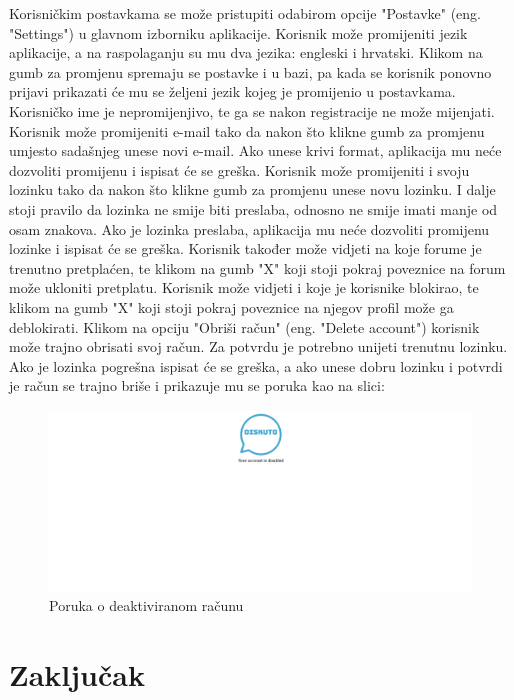 \documentclass{foi}
\begin{document}
Korisničkim postavkama se može pristupiti odabirom opcije "Postavke" (eng. "Settings") u glavnom izborniku aplikacije. Korisnik može promijeniti jezik aplikacije, a na raspolaganju su mu dva jezika: engleski i hrvatski. Klikom na gumb za promjenu spremaju se postavke i u bazi, pa kada se korisnik ponovno prijavi prikazati će mu se željeni jezik kojeg je promijenio u postavkama. Korisničko ime je nepromijenjivo, te ga se nakon registracije ne može mijenjati. Korisnik može promijeniti e-mail tako da nakon što klikne gumb za promjenu umjesto sadašnjeg unese novi e-mail. Ako unese krivi format, aplikacija mu neće dozvoliti promijenu i ispisat će se greška. Korisnik može promijeniti i svoju lozinku tako da nakon što klikne gumb za promjenu unese novu lozinku. I dalje stoji pravilo da lozinka ne smije biti preslaba, odnosno ne smije imati manje od osam znakova. Ako je lozinka preslaba, aplikacija mu neće dozvoliti promijenu lozinke i ispisat će se greška. Korisnik također može vidjeti na koje forume je trenutno pretplaćen, te klikom na gumb "X" koji stoji pokraj poveznice na forum može ukloniti pretplatu. Korisnik može vidjeti i koje je korisnike blokirao, te klikom na gumb "X" koji stoji pokraj poveznice na njegov profil može ga deblokirati. Klikom na opciju "Obriši račun" (eng. "Delete account") korisnik može trajno obrisati svoj račun. Za potvrdu je potrebno unijeti trenutnu lozinku. Ako je lozinka pogrešna ispisat će se greška, a ako unese dobru lozinku i potvrdi je račun se trajno briše i prikazuje mu se poruka kao na slici:

\begin{figure}[h!]
    \centering
    \includegraphics[width=1\textwidth]{slike/deaktivacija.png}
    \caption{Poruka o deaktiviranom računu}
\end{figure}

\chapter{Zaključak}

\printbibliography[title=Popis literature]

\listoffigures
{}

\lstlistoflistings
{}
\end{document}
